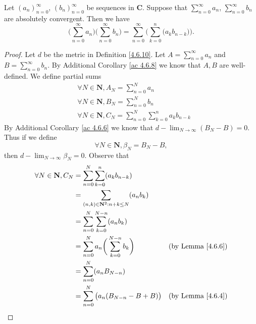 \begin{additional corollary}\label{ac 4.6.9}
Let \((a_n)_{n = 0}^\infty\), \((b_n)_{n = 0}^\infty\) be sequences in \(\mathbf{C}\).
Suppose that \(\sum_{n = 0}^\infty a_n\), \(\sum_{n = 0}^\infty b_n\) are absolutely convergent.
Then we have
\[
    \bigg(\sum_{n = 0}^\infty a_n\bigg) \bigg(\sum_{n = 0}^\infty b_n\bigg) = \sum_{n = 0}^\infty \bigg(\sum_{k = 0}^n \big(a_k b_{n - k}\big)\bigg).
\]
\end{additional corollary}

\begin{proof}
    Let \(d\) be the metric in Definition \ref{4.6.10}.
    Let \(A = \sum_{n = 0}^\infty a_n\) and \(B = \sum_{n = 0}^\infty b_n\).
    By Additional Corollary \ref{ac 4.6.8} we know that \(A, B\) are well-defined.
    We define partial sums
    \begin{align*}
         & \forall N \in \mathbf{N}, A_N = \sum_{n = 0}^N a_n                          \\
         & \forall N \in \mathbf{N}, B_N = \sum_{n = 0}^N b_n                          \\
         & \forall N \in \mathbf{N}, C_N = \sum_{n = 0}^N \sum_{k = 0}^n a_k b_{n - k}
    \end{align*}
    By Additional Corollary \ref{ac 4.6.6} we know that \(d - \lim_{N \to \infty} (B_N - B) = 0\).
    Thus if we define
    \[
        \forall N \in \mathbf{N}, \beta_N = B_N - B,
    \]
    then \(d - \lim_{N \to \infty} \beta_N = 0\).
    Observe that
    \begin{align*}
        \forall N \in \mathbf{N}, C_N & = \sum_{n = 0}^N \sum_{k = 0}^n (a_k b_{n - k})                                                         \\
                                      & = \sum_{(n, k) \in \mathbf{N}^2 : n + k \leq N} (a_n b_k)                                               \\
                                      & = \sum_{n = 0}^N \sum_{k = 0}^{N - n} (a_n b_k)                                                         \\
                                      & = \sum_{n = 0}^N a_n \bigg(\sum_{k = 0}^{N - n} b_k\bigg)               & \text{(by Lemma \ref{4.6.6})} \\
                                      & = \sum_{n = 0}^N (a_n B_{N - n})                                                                        \\
                                      & = \sum_{n = 0}^N \big(a_n (B_{N - n} - B + B)\big)                      & \text{(by Lemma \ref{4.6.4})} \\

\end{align*}
\end{proof}
